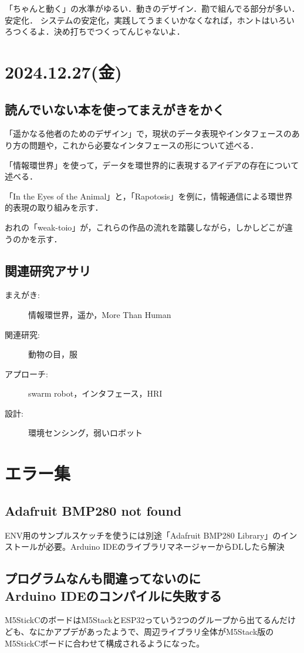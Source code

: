 \documentclass[fleqn,twocolumn]{mynote}
\begin{document}
  「ちゃんと動く」の水準がゆるい．動きのデザイン．勘で組んでる部分が多い．安定化．
  システムの安定化，実践してうまくいかなくなれば，ホントはいろいろつくるよ．決め打ちでつくってんじゃないよ．

  \section*{2024.12.27(金)}

  \subsection*{読んでいない本を使ってまえがきをかく}
  「遥かなる他者のためのデザイン」で，現状のデータ表現やインタフェースのあり方の問題や，これから必要なインタフェースの形について述べる．

  「情報環世界」を使って，データを環世界的に表現するアイデアの存在について述べる．

  「In the Eyes of the Animal」と，「Rapotosis」を例に，情報通信による環世界的表現の取り組みを示す．

  おれの「weak-toio」が，これらの作品の流れを踏襲しながら，しかしどこが違うのかを示す．

  \subsection*{関連研究アサリ}
  \begin{description}
    \item[まえがき:]情報環世界，遥か，More Than Human
    \item[関連研究:]動物の目，服
    \item[アプローチ:]swarm robot，インタフェース，HRI
    \item[設計:]環境センシング，弱いロボット
  \end{description}

  \section*{エラー集}
  \subsection*{Adafruit BMP280 not found}
  ENV用のサンプルスケッチを使うには別途「Adafruit BMP280 Library」のインストールが必要。Arduino
  IDEのライブラリマネージャーからDLしたら解決

  \subsection*{プログラムなんも間違ってないのに\\Arduino IDEのコンパイルに失敗する}
  M5StickCのボードはM5StackとESP32っていう2つのグループから出てるんだけども、なにかアプデがあったようで、周辺ライブラリ全体がM5Stack版のM5StickCボードに合わせて構成されるようになった。
\end{document}

